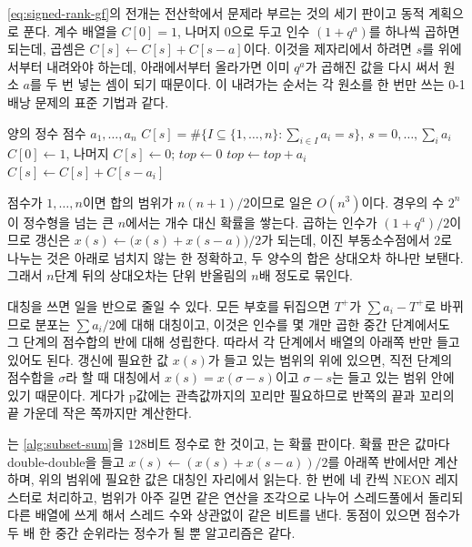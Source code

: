 \cref{eq:signed-rank-gf}의 전개는 전산학에서  문제라 부르는 것의 세기 판이고 동적 계획으로 푼다. 계수 배열을 $C[0]=1$, 나머지 $0$으로 두고 인수 $(1+q^a)$를 하나씩 곱하면 되는데, 곱셈은 $C[s]\gets C[s]+C[s-a]$이다. 이것을 제자리에서 하려면 $s$를 위에서부터 내려와야 하는데, 아래에서부터 올라가면 이미 $q^a$가 곱해진 값을 다시 써서 원소 $a$를 두 번 넣는 셈이 되기 때문이다. 이 내려가는 순서는 각 원소를 한 번만 쓰는 0-1 배낭 문제의 표준 기법과 같다.

\begin{algorithm}[t]
\begin{algorithmic}[1]
\Require 양의 정수 점수 $a_1,\dots,a_n$
\Ensure $C[s]=\#\{I\subseteq\{1,\dots,n\}:\sum_{i\in I}a_i=s\}$, $s=0,\dots,\sum_ia_i$
\State $C[0]\gets1$, 나머지 $C[s]\gets0$; $\mathit{top}\gets0$
  \State $\mathit{top}\gets\mathit{top}+a_i$
   
    \State $C[s]\gets C[s]+C[s-a_i]$
  \EndFor
\EndFor
\end{algorithmic}
\caption{부분집합 합의 개수}
\label{alg:subset-sum}
\end{algorithm}

점수가 $1,\dots,n$이면 합의 범위가 $n(n+1)/2$이므로 일은 $O(n^3)$이다. 경우의 수 $2^n$이 정수형을 넘는 큰 $n$에서는 개수 대신 확률을 쌓는다. 곱하는 인수가 $(1+q^a)/2$이므로 갱신은 $x(s)\gets\bigl(x(s)+x(s-a)\bigr)/2$가 되는데, 이진 부동소수점에서 $2$로 나누는 것은 아래로 넘치지 않는 한 정확하고, 두 양수의 합은 상대오차 하나만 보탠다. 그래서 $n$단계 뒤의 상대오차는 단위 반올림의 $n$배 정도로 묶인다.

대칭을 쓰면 일을 반으로 줄일 수 있다. 모든 부호를 뒤집으면 $T^+$가 $\sum a_i-T^+$로 바뀌므로 분포는 $\sum a_i/2$에 대해 대칭이고, 이것은 인수를 몇 개만 곱한 중간 단계에서도 그 단계의 점수합의 반에 대해 성립한다. 따라서 각 단계에서 배열의 아래쪽 반만 들고 있어도 된다. 갱신에 필요한 값 $x(s)$가 들고 있는 범위의 위에 있으면, 직전 단계의 점수합을 $\sigma$라 할 때 대칭에서 $x(s)=x(\sigma-s)$이고 $\sigma-s$는 들고 있는 범위 안에 있기 때문이다. 게다가 p값에는 관측값까지의 꼬리만 필요하므로 반쪽의 끝과 꼬리의 끝 가운데 작은 쪽까지만 계산한다.

\begin{instardust}
는 \cref{alg:subset-sum}을 $128$비트 정수로 한 것이고, 는 확률 판이다. 확률 판은 값마다 double-double을 들고 $x(s)\gets(x(s)+x(s-a))/2$를 아래쪽 반에서만 계산하며, 위의 범위에 필요한 값은 대칭인 자리에서 읽는다. 한 번에 네 칸씩 NEON 레지스터로 처리하고, 범위가 아주 길면 같은 연산을 조각으로 나누어 스레드풀에서 돌리되 다른 배열에 쓰게 해서 스레드 수와 상관없이 같은 비트를 낸다. 동점이 있으면 점수가 두 배 한 중간 순위라는 정수가 될 뿐 알고리즘은 같다.
\end{instardust}

